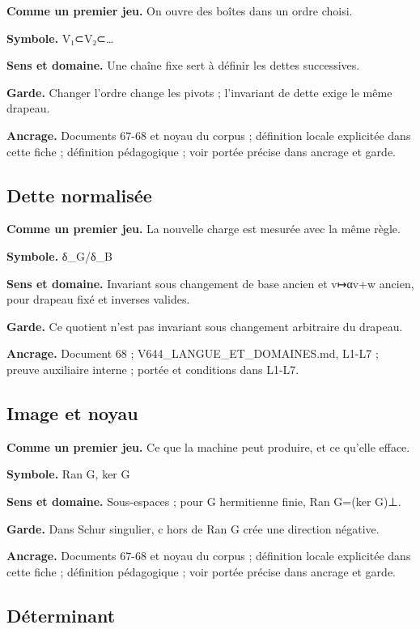 \documentclass[
  9pt,
  a4paper,
]{article}
\begin{document}
\textbf{Comme un premier jeu.} On ouvre des boîtes dans un ordre choisi.

\textbf{Symbole.} V₁⊂V₂⊂\ldots{}

\textbf{Sens et domaine.} Une chaîne fixe sert à définir les dettes
successives.

\textbf{Garde.} Changer l'ordre change les pivots ; l'invariant de dette
exige le même drapeau.

\textbf{Ancrage.} Documents 67-68 et noyau du corpus ; définition locale
explicitée dans cette fiche ; définition pédagogique ; voir portée
précise dans ancrage et garde.

\hypertarget{dette-normalisuxe9e}{%
\subsection{Dette normalisée}\label{dette-normalisuxe9e}}

\textbf{Comme un premier jeu.} La nouvelle charge est mesurée avec la
même règle.

\textbf{Symbole.} δ\_G/δ\_B

\textbf{Sens et domaine.} Invariant sous changement de base ancien et
v↦αv+w ancien, pour drapeau fixé et inverses valides.

\textbf{Garde.} Ce quotient n'est pas invariant sous changement
arbitraire du drapeau.

\textbf{Ancrage.} Document 68 ; V644\_LANGUE\_ET\_DOMAINES.md, L1-L7 ;
preuve auxiliaire interne ; portée et conditions dans L1-L7.

\hypertarget{image-et-noyau}{%
\subsection{Image et noyau}\label{image-et-noyau}}

\textbf{Comme un premier jeu.} Ce que la machine peut produire, et ce
qu'elle efface.

\textbf{Symbole.} Ran G, ker G

\textbf{Sens et domaine.} Sous-espaces ; pour G hermitienne finie, Ran
G=(ker G)⊥.

\textbf{Garde.} Dans Schur singulier, c hors de Ran G crée une direction
négative.

\textbf{Ancrage.} Documents 67-68 et noyau du corpus ; définition locale
explicitée dans cette fiche ; définition pédagogique ; voir portée
précise dans ancrage et garde.

\hypertarget{duxe9terminant}{%
\subsection{Déterminant}\label{duxe9terminant}}
\end{document}
